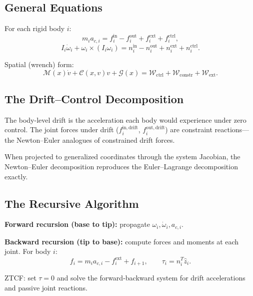\documentclass[11pt]{article}
\begin{document}
\subsection{General Equations}

For each rigid body $i$:
\begin{equation}\label{eq:ne-trans}
m_i a_{c,i} = f_i^{\mathrm{in}} - f_i^{\mathrm{out}} + f_i^{\mathrm{ext}} + f_i^{\mathrm{ctrl}},
\end{equation}
\begin{equation}\label{eq:ne-rot}
I_i\dot\omega_i + \omega_i\times(I_i\omega_i) = n_i^{\mathrm{in}} - n_i^{\mathrm{out}} + n_i^{\mathrm{ext}} + n_i^{\mathrm{ctrl}}.
\end{equation}

Spatial (wrench) form:
\begin{equation}\label{eq:ne-assembled}
\mathcal{M}(x)\dot{v} + \mathcal{C}(x,v)v + \mathcal{G}(x) = \mathcal{W}_{\mathrm{ctrl}} + \mathcal{W}_{\mathrm{constr}} + \mathcal{W}_{\mathrm{ext}}.
\end{equation}

\subsection{The Drift--Control Decomposition}

The body-level drift is the acceleration each body would experience under zero control.
The joint forces under drift ($f_i^{\mathrm{in,drift}}$, $f_i^{\mathrm{out,drift}}$) are constraint reactions---the Newton--Euler analogues of constrained drift forces.

When projected to generalized coordinates through the system Jacobian, the Newton--Euler decomposition reproduces the Euler--Lagrange decomposition exactly.

\subsection{The Recursive Algorithm}

\textbf{Forward recursion (base to tip):} propagate $\omega_i, \dot\omega_i, a_{c,i}$.

\textbf{Backward recursion (tip to base):} compute forces and moments at each joint.
For body $i$:
\begin{equation}
f_i = m_i a_{c,i} - f_i^{\mathrm{ext}} + f_{i+1}, \qquad \tau_i = n_i^T \hat{z}_i.
\end{equation}

ZTCF: set $\tau=0$ and solve the forward-backward system for drift accelerations and passive joint reactions.
\end{document}
